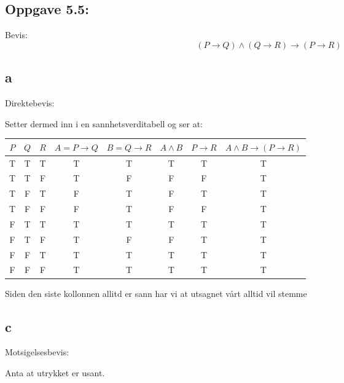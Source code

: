 \documentclass[a4paper, norsk, 10pt]{article}
\begin{document}
\begin{flushleft}
\section*{Oppgave 5.5:}
Bevis:
\[(P \rightarrow Q) \land (Q \rightarrow R) \rightarrow (P \rightarrow R)\]
\subsection*{a}
Direktebevis:

Setter dermed inn i en sannhetsverditabell og ser at:

\begin{table}[h!]
\begin{tabular}{c c c || c c c c c}
$P$ & $Q$ & $R$ & $A= P \rightarrow Q$ & $ B = Q \rightarrow R$ & $A \land B $ & $ P \rightarrow R$ & $A \land B \rightarrow (P \rightarrow R)$\\
\hline
T & T & T & T & T & T & T & T\\
T & T & F & T & F & F & F & T\\
T & F & T & F & T & F & T & T\\
T & F & F & F & T & F & F & T\\
F & T & T & T & T & T & T & T\\
F & T & F & T & F & F & T & T\\
F & F & T & T & T & T & T & T\\
F & F & F & T & T & T & T & T

\end{tabular}
\end{table}

Siden den siste kollonnen allitd er sann har vi at utsagnet vårt alltid vil stemme


\subsection*{c}
Motsigelsesbevis:

Anta at utrykket er usant. 
\end{flushleft}
\end{document}
